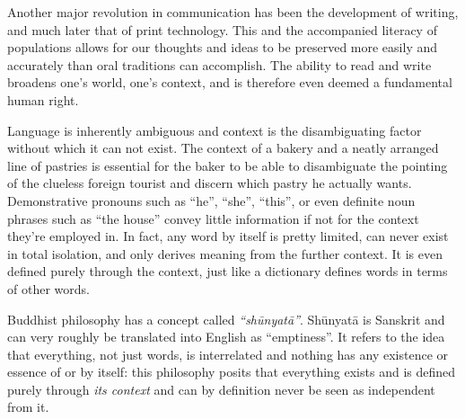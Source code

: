 Another major revolution in communication has been the development of writing,
and much later that of print technology. This and the accompanied literacy of
populations allows for our thoughts and ideas to be preserved more easily and
accurately than oral traditions can accomplish. The ability to read and write
broadens one's world, one's context, and is therefore even deemed a fundamental
human right. 

Language is inherently ambiguous and context is the disambiguating factor
without which it can not exist. The context of a bakery and a neatly arranged
line of pastries is essential for the baker to be able to disambiguate the
pointing of the clueless foreign tourist and discern which pastry he actually
wants. Demonstrative pronouns such as ``he'', ``she'', ``this'', or even
definite noun phrases such as ``the house'' convey little information if not
for the context they're employed in.  In fact, any word by itself is pretty
limited, can never exist in total isolation, and only derives meaning from the
further context. It is even defined purely through the context, just like a
dictionary defines words in terms of other words.


Buddhist philosophy has a concept called \emph{``sh\=unyat\=a''}. Sh\=unyat\=a is Sanskrit and can
very roughly be translated into English as ``emptiness''. It  refers to the
idea that everything, not just words, is interrelated and nothing has any
existence or essence of or by itself: this philosophy posits that everything
exists and is defined purely through \emph{its context} and can by definition
never be seen as independent from it.

